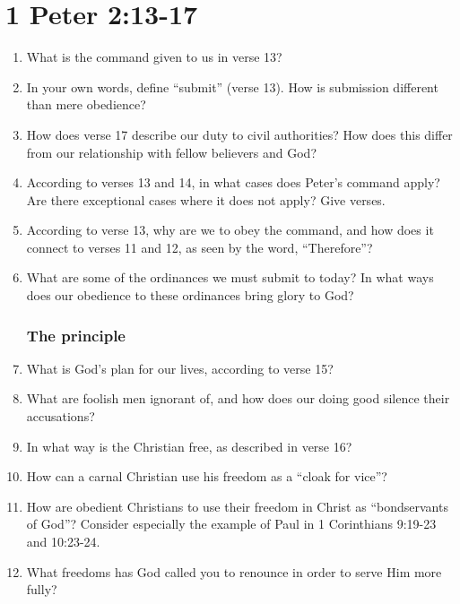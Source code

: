 \documentclass{article}
\newcommand{\answerbox}{\vspace{1.5cm}}
\newcommand{\BE}{\begin{enumerate}}
\newcommand{\EE}{\end{enumerate}}
\newcommand{\I}{\item}
\begin{document}
\part*{1 Peter 2:13-17}

\BE
\section*{The command}
\I  What is the command given to us in verse 13? \answerbox
\I  In your own words, define ``submit'' (verse 13). 
    How is submission different than mere obedience? \answerbox
\I  How does verse 17 describe our duty to civil authorities?
    How does this differ from our relationship with fellow believers and God?
        \answerbox
\I  According to verses 13 and 14, in what cases does Peter's command apply?
    Are there exceptional cases where it does not apply? Give verses. 
        \answerbox
\I  According to verse 13, why are we to obey the command, and how does it 
        connect to verses 11 and 12, as seen by the word, ``Therefore''? 
        \answerbox
\I  What are some of the ordinances we must submit to today? 
    In what ways does our obedience to these ordinances bring glory to God? 
        \answerbox

\section*{The principle}
\I  What is God's plan for our lives, according to verse 15? \answerbox
\I  What are foolish men ignorant of, and how does our doing good silence
        their accusations? \answerbox
\I  In what way is the Christian free, as described in verse 16? \answerbox
\I  How can a carnal Christian use his freedom as a ``cloak for vice''?
        \answerbox
\I  How are obedient Christians to use their freedom in Christ as 
        ``bondservants of God''? 
    Consider especially the example of Paul in 1 Corinthians 9:19-23 and
        10:23-24. \answerbox
\I  What freedoms has God called you to renounce in order to serve Him more
        fully? \answerbox
\EE
\end{document}

